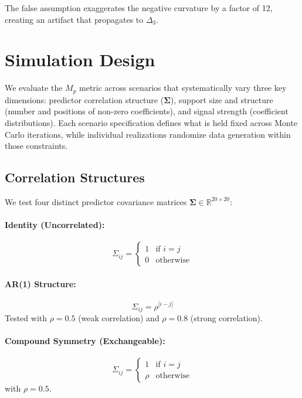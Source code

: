 \documentclass[11pt,a4paper]{article}
\begin{document}
The false assumption exaggerates the negative curvature by a factor of 12, creating an artifact that propagates to $\Delta_3$.

\section{Simulation Design}

We evaluate the $M_p$ metric across scenarios that systematically vary three key dimensions: predictor correlation structure ($\mathbf{\Sigma}$), support size and structure (number and positions of non-zero coefficients), and signal strength (coefficient distributions). Each scenario specification defines what is held fixed across Monte Carlo iterations, while individual realizations randomize data generation within those constraints.

\subsection{Correlation Structures}

We test four distinct predictor covariance matrices $\mathbf{\Sigma} \in \mathbb{R}^{20 \times 20}$:

\paragraph{Identity (Uncorrelated):}
\begin{equation}
\Sigma_{ij} = \begin{cases}
1 & \text{if } i = j \\
0 & \text{otherwise}
\end{cases}
\end{equation}

\paragraph{AR(1) Structure:}
\begin{equation}
\Sigma_{ij} = \rho^{|i-j|}
\end{equation}
Tested with $\rho = 0.5$ (weak correlation) and $\rho = 0.8$ (strong correlation).

\paragraph{Compound Symmetry (Exchangeable):}
\begin{equation}
\Sigma_{ij} = \begin{cases}
1 & \text{if } i = j \\
\rho & \text{otherwise}
\end{cases}
\end{equation}
with $\rho = 0.5$.
\end{document}
